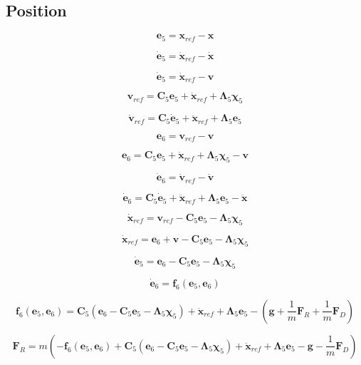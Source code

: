\subsection{Position}

\[
\mathbf{e}_5 = \mathbf{x}_{ref} - \mathbf{x}
\]

\[
\dot{\mathbf{e}}_5 = \dot{\mathbf{x}}_{ref} - \dot{\mathbf{x}}
\]

\[
\dot{\mathbf{e}}_5 = \dot{\mathbf{x}}_{ref} - \mathbf{v}
\]

\[
\mathbf{v}_{ref} = \mathbf{C}_5 \mathbf{e}_5 + \dot{\mathbf{x}}_{ref} + \boldsymbol\Lambda_5 \boldsymbol\chi_5
\]

\[
\dot{\mathbf{v}}_{ref} = \mathbf{C}_5 \dot{\mathbf{e}}_5 + \ddot{\mathbf{x}}_{ref} + \boldsymbol\Lambda_5 \mathbf{e}_5
\]


\[
\mathbf{e}_6 = \mathbf{v}_{ref} - \mathbf{v}
\]

\[
\mathbf{e}_6 = \mathbf{C}_5 \mathbf{e}_5 + \dot{\mathbf{x}}_{ref} + \boldsymbol\Lambda_5 \boldsymbol\chi_5 - \mathbf{v}
\]

\[
\dot{\mathbf{e}}_6 = \dot{\mathbf{v}}_{ref} - \dot{\mathbf{v}}
\]

\[
\dot{\mathbf{e}}_6 = \mathbf{C}_5 \dot{\mathbf{e}}_5 + \ddot{\mathbf{x}}_{ref} + \boldsymbol\Lambda_5 \mathbf{e}_5 - \ddot{\mathbf{x}}
\]

\[
\dot{\mathbf{x}}_{ref} = \mathbf{v}_{ref} - \mathbf{C}_5 \mathbf{e}_5 - \boldsymbol\Lambda_5 \boldsymbol\chi_5
\]

\[
\dot{\mathbf{x}}_{ref} = \mathbf{e}_6 + \mathbf{v} - \mathbf{C}_5 \mathbf{e}_5 - \boldsymbol\Lambda_5 \boldsymbol\chi_5
\]

\[
\dot{\mathbf{e}}_5 = \mathbf{e}_6 - \mathbf{C}_5 \mathbf{e}_5 - \boldsymbol\Lambda_5 \boldsymbol\chi_5
\]

\[
\dot{\mathbf{e}}_6 = \mathbf{f}_6(\mathbf{e}_5,\mathbf{e}_6)
\]

\[
\mathbf{f}_6(\mathbf{e}_5,\mathbf{e}_6)
= \mathbf{C}_5 \left( \mathbf{e}_6 - \mathbf{C}_5 \mathbf{e}_5 - \boldsymbol\Lambda_5 \boldsymbol\chi_5 \right)
+ \ddot{\mathbf{x}}_{ref}
+ \boldsymbol\Lambda_5 \mathbf{e}_5
- \left(
\mathbf{g}
+ \frac{1}{m} \mathbf{F}_{R}
+ \frac{1}{m} \mathbf{F}_{D}
\right)
\]

\[
\mathbf{F}_{R}
= m \left(
	-\mathbf{f}_6(\mathbf{e}_5,\mathbf{e}_6)
	+ \mathbf{C}_5 \left( \mathbf{e}_6 - \mathbf{C}_5 \mathbf{e}_5 - \boldsymbol\Lambda_5 \boldsymbol\chi_5 \right)
	+ \ddot{\mathbf{x}}_{ref}
	+ \boldsymbol\Lambda_5 \mathbf{e}_5
	- \mathbf{g}
	- \frac{1}{m} \mathbf{F}_{D}
\right)
\]

